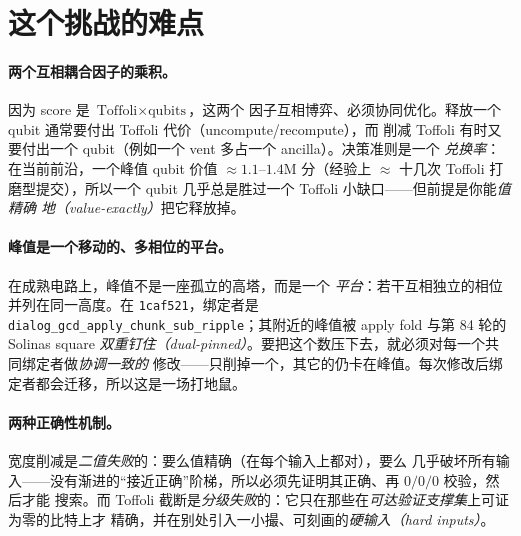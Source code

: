 \documentclass[11pt]{ctexart}
\let\c\lstinline
\begin{document}
\section{这个挑战的难点}

\paragraph{两个互相耦合因子的乘积。}因为 score 是 $\text{Toffoli}\times\text{qubits}$，这两个
因子互相博弈、必须协同优化。释放一个 qubit 通常要付出 Toffoli 代价（uncompute/recompute），而
削减 Toffoli 有时又要付出一个 qubit（例如一个 vent 多占一个 ancilla）。决策准则是一个
\emph{兑换率}：在当前前沿，一个峰值 qubit 价值 $\approx 1.1$--$1.4$M 分（经验上 $\approx$ 十几次
Toffoli 打磨型提交），所以一个 qubit 几乎总是胜过一个 Toffoli 小缺口——但前提是你能\emph{值精确
地（value-exactly）}把它释放掉。

\paragraph{峰值是一个移动的、多相位的平台。}在成熟电路上，峰值不是一座孤立的高塔，而是一个
\emph{平台}：若干互相独立的相位并列在同一高度。在 \texttt{1caf521}，绑定者是
\c{dialog_gcd_apply_chunk_sub_ripple}；其附近的峰值被 apply fold 与第 84 轮的 Solinas square
\emph{双重钉住（dual-pinned）}。要把这个数压下去，就必须对每一个共同绑定者做\emph{协调一致的}
修改——只削掉一个，其它的仍卡在峰值。每次修改后绑定者都会迁移，所以这是一场打地鼠。

\paragraph{两种正确性机制。}宽度削减是\emph{二值失败}的：要么值精确（在每个输入上都对），要么
几乎破坏所有输入——没有渐进的``接近正确''阶梯，所以必须先证明其正确、再 $0/0/0$ 校验，然后才能
搜索。而 Toffoli 截断是\emph{分级失败}的：它只在那些在\emph{可达验证支撑集}上可证为零的比特上才
精确，并在别处引入一小撮、可刻画的\emph{硬输入（hard inputs）}。
\end{document}
